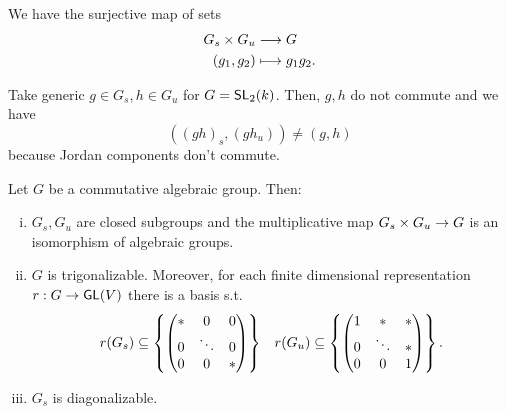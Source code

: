 We have the surjective map of sets
\begin{align*}
G_s \times G_u & \overset{}{\longrightarrow} G\\
(g_1, g_2) & \longmapsto g_1g_2.
\end{align*}
\begin{example}
Take generic $g \in G_s, h \in G_u$ for $G=\textsf{SL}_2(k)$. Then, $g,h$ do not commute and we have
\[ ((gh)_s, (gh_u)) \neq (g, h) \]
because Jordan components don't commute.
\end{example}
\begin{theorem}
Let $G$ be a commutative algebraic group. Then:
\begin{enumerate}[(i)]
	\item $G_s, G_u$ are closed subgroups and the multiplicative map $G_s \times G_u \overset{}{\rightarrow} G$ is an isomorphism of algebraic groups.
	\item $G$ is trigonalizable. Moreover, for each finite dimensional representation $r : G \overset{}{\rightarrow} \textsf{GL}(V)$ there is a basis s.t.
	\begin{align*}
	r(G_s) \subseteq \left\lbrace\left(\begin{matrix} * & 0& 0\\
	0 & \ddots & 0\\
0 & 0 & * \end{matrix}\right)\right\rbrace && 
	r(G_u) \subseteq \left\lbrace\left(\begin{matrix} 1 & * & *\\
		0 & \ddots & *\\
		0 & 0 & 1 \end{matrix}\right)\right\rbrace.
	\end{align*}
	\item $G_s$ is diagonalizable.
\end{enumerate}
\end{theorem}
